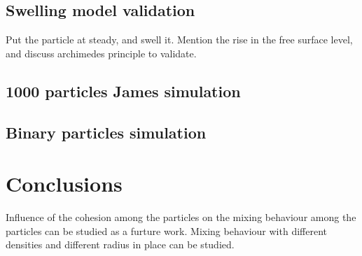 \documentclass[preprint,12pt]{elsarticle}
\begin{document}
\subsection*{Swelling model validation}

Put the particle at steady, and swell it. Mention the rise in the free surface
level, and discuss archimedes principle to validate.


\subsection*{1000 particles James simulation}

\subsection*{Binary particles simulation}


\FloatBarrier%
\section{Conclusions}
\label{sec:conclusions}

Influence of the cohesion among the particles on the mixing behaviour among
the particles can be studied as a furture work. Mixing behaviour with
different densities and different radius in place can be studied.






\end{document}
